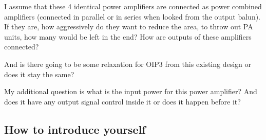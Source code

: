 \documentclass{article}
\begin{document}
I assume that these 4 identical power amplifiers are connected as power combined amplifiers (connected in parallel or in series when looked from the output balun). If they are, how aggressively do they want to reduce the area, to throw out PA units, how many would be left in the end? How are outputs of these amplifiers connected? %




And is there going to be some relaxation for OIP3 from this existing design or does it stay the same?

My additional question is what is the input power for this power amplifier? And does it have any output signal control inside it or does it happen before it?

\newpage

\subsection{How to introduce yourself}
\end{document}
